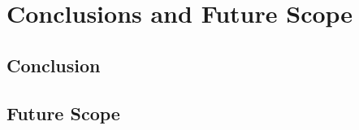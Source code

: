 \chapter{Conclusions and Future Scope}

\section{Conclusion}
\lipsum[1-2]

\section{Future Scope}
\lipsum[1-2]